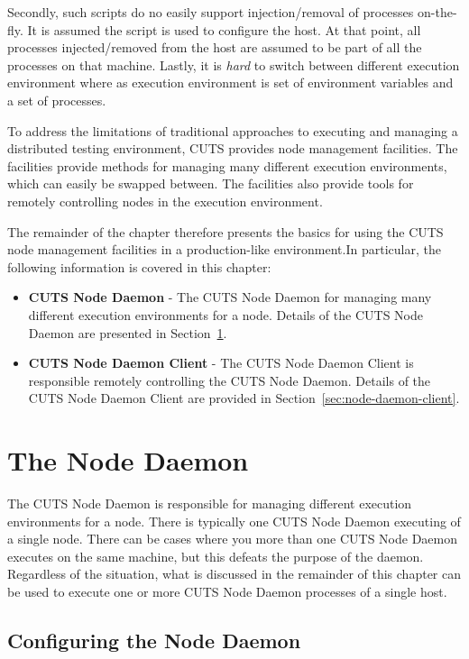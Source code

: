 Secondly, such scripts do no easily support injection/removal
of processes on-the-fly. It is assumed the script is used to 
configure the host. At that point, all processes injected/removed
from the host are assumed to be part of all the processes on 
that machine. Lastly, it is \textit{hard} to switch between
different execution environment where as execution environment
is set of environment variables and a set of processes.

To address the limitations of traditional approaches to executing
and managing a distributed testing environment, CUTS provides
node management facilities. The facilities provide methods for 
managing many different execution environments, which can easily 
be swapped between. The facilities also provide tools for remotely
controlling nodes in the execution environment. 

The remainder of the chapter therefore presents the basics for
using the CUTS node management facilities in a production-like 
environment.In particular, the following information is covered 
in this chapter:
\begin{itemize}
  \item \textbf{CUTS Node Daemon} - The CUTS Node Daemon for 
  managing many different execution environments for a node. 
  Details of the CUTS Node Daemon are presented in Section~\ref{sec:node-daemon}.

  \item \textbf{CUTS Node Daemon Client} - The CUTS Node Daemon Client 
  is responsible remotely controlling the CUTS Node Daemon. Details of 
  the CUTS Node Daemon Client are provided in 
  Section~\ref{sec:node-daemon-client}.
\end{itemize}

\section{The Node Daemon}
\label{sec:node-daemon}

The CUTS Node Daemon is responsible for managing different execution
environments for a node. There is typically one CUTS Node Daemon executing
of a single node. There can be cases where you more than one CUTS
Node Daemon executes on the same machine, but this defeats the purpose
of the daemon. Regardless of the situation, what is discussed in the
remainder of this chapter can be used to execute one or more 
CUTS Node Daemon processes of a single host.

\subsection{Configuring the Node Daemon}
\label{sec:node-daemon-config}

